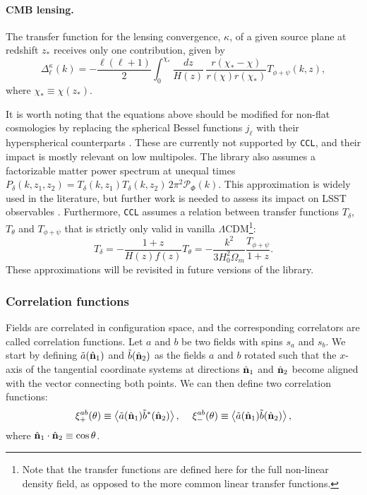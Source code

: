 \documentclass[\docopts]{\docclass}
\newcommand{\nv}{\hat{\bf n}}
\newcommand{\ccl}{{\tt CCL}\xspace}
\begin{document}
\begin{itemize}
\end{itemize}

\paragraph{\bf CMB lensing.} The transfer function for the lensing convergence, $\kappa$, of a given source plane at redshift $z_*$ receives only one contribution, given by
\begin{equation}
  \Delta_\ell^\kappa(k)=-\frac{\ell(\ell+1)}{2}\int_0^{\chi_*}\frac{dz}{H(z)}\,\frac{r(\chi_*-\chi)}{r(\chi)r(\chi_*)}T_{\phi+\psi}(k,z),
  \label{eq:cmblens}
\end{equation}
where $\chi_*\equiv\chi(z_*)$.

\noindent
It is worth noting that the equations above should be modified for non-flat cosmologies by replacing the spherical Bessel functions $j_\ell$ with their hyperspherical counterparts \citep{1994ApJ...432....7K}. These are currently not supported by \ccl, and their impact is mostly relevant on low multipoles. The library also assumes a factorizable matter power spectrum at unequal times $P_\delta(k,z_1,z_2)=T_\delta(k,z_1)T_\delta(k,z_2)\,2\pi^2\mathcal{P}_\Phi(k)$. This approximation is widely used in the literature, but further work is needed to assess its impact on LSST observables \citep{2017PhRvD..95f3522K}. Furthermore, \ccl assumes a relation between transfer functions $T_\delta$, $T_\theta$ and $T_{\phi+\psi}$ that is strictly only valid in vanilla $\Lambda$CDM\footnote{Note that the transfer functions are defined here for the full non-linear density field, as opposed to the more common linear transfer functions.}:
\begin{equation}
  T_\delta=-\frac{1+z}{H(z)f(z)}T_\theta=-\frac{k^2}{3H_0^2\Omega_m}\frac{T_{\phi+\psi}}{1+z}.
\end{equation}
These approximations will be revisited in future versions of the library.


\subsubsection{Correlation functions}

Fields are correlated in configuration space, and the corresponding correlators are called correlation functions. Let $a$ and $b$ be two fields with spins $s_a$ and $s_b$. We start by defining $\tilde{a}(\nv_1)$ and $\tilde{b}(\nv_2)$ as the fields $a$ and $b$ rotated such that the $x$-axis of the tangential coordinate systems at directions $\nv_1$ and $\nv_2$ become aligned with the vector connecting both points. We can then define two correlation functions:
\begin{equation}\nonumber
  \xi^{ab}_+(\theta)\equiv\left\langle\tilde{a}(\nv_1)\tilde{b}^*(\nv_2)\right\rangle,\hspace{12pt}
  \xi^{ab}_-(\theta)\equiv\left\langle\tilde{a}(\nv_1)\tilde{b}(\nv_2)\right\rangle,
  \label{eq:xipm}
\end{equation}
where $\nv_1\cdot\nv_2\equiv\cos\theta$. 
\end{document}
